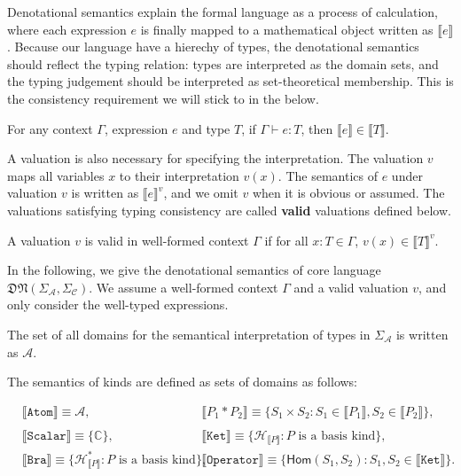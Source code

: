 \documentclass[manuscript, review, timestamp]{acmart}
\newcommand*{\sem}[1]{\llbracket #1 \rrbracket}
\begin{document}
Denotational semantics explain the formal language as a process of calculation, where each expression $e$ is finally mapped to a mathematical object written as $\sem{e}$.
Because our language have a hierechy of types, the denotational semantics should reflect the typing relation: types are interpreted as the domain sets, and the typing judgement should be interpreted as set-theoretical membership. This is the consistency requirement we will stick to in the below.

\begin{definition}
  For any context $\Gamma$, expression $e$ and type $T$, if $\Gamma \vdash e : T$, then $\sem{e} \in \sem{T}$.
\end{definition}

A valuation is also necessary for specifying the interpretation. The valuation $v$ maps all variables $x$ to their interpretation $v(x)$. The semantics of $e$ under valuation $v$ is written as $\sem{e}^v$, and we omit $v$ when it is obvious or assumed.
The valuations satisfying typing consistency are called \textbf{valid} valuations defined below.
\begin{definition}
  A valuation $v$ is valid in well-formed context $\Gamma$ if for all $x : T \in \Gamma$, $v(x) \in \sem{T}^v$.
\end{definition}

In the following, we give the denotational semantics of core language $\mathfrak{DN}(\Sigma_\mathcal{A}, \Sigma_\mathcal{C})$. We assume a well-formed context $\Gamma$ and a valid valuation $v$, and only consider the well-typed expressions.

\begin{definition}
  The set of all domains for the semantical interpretation of types in $\Sigma_{\mathcal{A}}$ is written as $\mathcal{A}$.
\end{definition}

\begin{definition} The semantics of kinds are defined as sets of domains as follows:

  \begin{align*}
    & \sem{\texttt{Atom}} \equiv \mathcal{A},
    \qquad
    && \sem{P_1 * P_2} \equiv \{ S_1 \times S_2 : S_1 \in \sem{P_1}, S_2 \in \sem{P_2} \}, \\
    \\
    & \sem{\texttt{Scalar}} \equiv \{ \mathbb{C} \},
    \qquad
    && \sem{\texttt{Ket}} \equiv \{ \mathcal{H}_{\sem{P}} : P \text{ is a basis kind} \}, \\
    & \sem{\texttt{Bra}} \equiv \{ \mathcal{H}^*_{\sem{P}} : P \text{ is a basis kind} \},
    \qquad
    && \sem{\texttt{Operator}} \equiv \{ \textsf{Hom}(S_1, S_2) : S_1, S_2 \in \sem{\texttt{Ket}} \}.
  \end{align*}
\end{definition}
\end{document}
